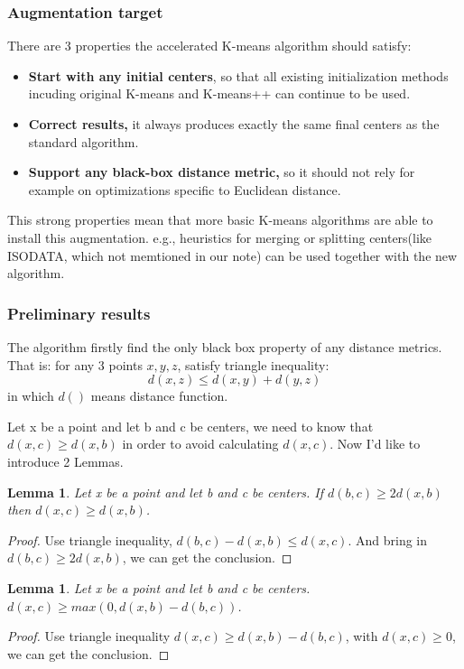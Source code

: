 \documentclass[11pt]{article}
\newtheorem{lemma}[theorem]{Lemma}
\begin{document}
\subsubsection{Augmentation target}
There are 3 properties the accelerated K-means algorithm should satisfy:
\begin{itemize}
\item \textbf{Start with any initial centers}, so that all existing initialization methods incuding original K-means and K-means++ can continue to be used.
\item \textbf{Correct results, } it always produces exactly the same final centers as the standard  algorithm.
\item \textbf{Support any black-box distance metric,} so it should not rely for example on optimizations specific to Euclidean distance.
\end{itemize} \par
This strong properties mean that more basic K-means algorithms are able to install this augmentation. e.g., heuristics for merging or splitting centers(like  ISODATA, which not memtioned in our note) can be used together with the new algorithm.

\subsubsection{Preliminary results}
The algorithm firstly find the only black box property of any distance metrics. That is: for any 3 points $x, y, z$, satisfy  triangle inequality:
$$d(x,z) \le d(x, y) + d(y, z)$$ in which $d()$ means distance function.\par
Let x be a point and let b and c be centers, we need to know that $d(x, c) \ge d(x, b)$ in order to avoid calculating $d(x, c)$. Now I'd like to introduce 2 Lemmas.
\begin{lemma}
Let x be a point and let b and c be centers. If $d(b, c) \ge 2d(x,b)$ then $d(x,c) \ge d(x,b)$.
\end{lemma}
\begin{proof}
Use triangle inequality, $d(b,c) - d(x,b)\le d(x,c)$. And bring in $d(b, c) \ge 2d(x,b)$, we can get the conclusion.
\end{proof}
\begin{lemma}
Let x be a point and let b and c be centers. $d(x,c) \ge max(0, d(x,b)-d(b,c))$.
\end{lemma}
\begin{proof}
Use triangle inequality $d(x,c) \ge d(x,b)-d(b,c)$, with $d(x,c) \ge 0$, we can get the conclusion.
\end{proof}
\end{document}
